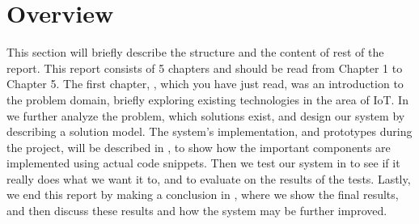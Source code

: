 \section{Overview}\label{sec:overview}
This section will briefly describe the structure and the content of rest of the report. 
This report consists of 5 chapters and should be read from Chapter 1 to Chapter 5. 
The first chapter, , which you have just read, 
was an introduction to the problem domain, 
briefly exploring existing technologies in the area of IoT. 
In  we further analyze the problem, 
which solutions exist, 
and design our system by describing a solution model. 
The system's implementation, and prototypes during the project, 
will be described in , 
to show how the important components are implemented using actual code snippets. 
Then we test our system in  to see if it really does what we want it to, 
and to evaluate on the results of the tests. 
Lastly, we end this report by making a conclusion in , 
where we show the final results, 
and then discuss these results and how the system may be further improved. 
